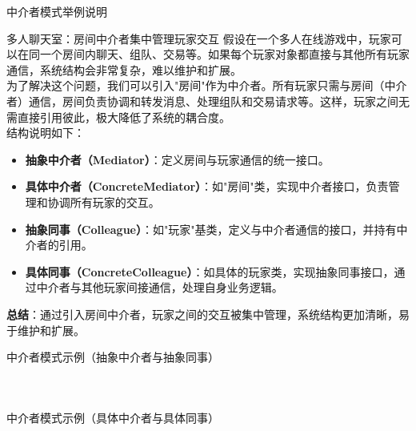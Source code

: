 \documentclass[UTF8,aspectratio=169]{beamer}
\begin{document}
\begin{frame}{中介者模式举例说明}
    \begin{exampleytublock}{多人聊天室：房间中介者集中管理玩家交互}
        假设在一个多人在线游戏中，玩家可以在同一个房间内聊天、组队、交易等。如果每个玩家对象都直接与其他所有玩家通信，系统结构会非常复杂，难以维护和扩展。\\
        为了解决这个问题，我们可以引入"房间"作为中介者。所有玩家只需与房间（中介者）通信，房间负责协调和转发消息、处理组队和交易请求等。这样，玩家之间无需直接引用彼此，极大降低了系统的耦合度。\\[0.5em]
        结构说明如下：
        \begin{itemize}
            \item \textbf{抽象中介者（Mediator）}：定义房间与玩家通信的统一接口。
            \item \textbf{具体中介者（ConcreteMediator）}：如"房间"类，实现中介者接口，负责管理和协调所有玩家的交互。
            \item \textbf{抽象同事（Colleague）}：如"玩家"基类，定义与中介者通信的接口，并持有中介者的引用。
            \item \textbf{具体同事（ConcreteColleague）}：如具体的玩家类，实现抽象同事接口，通过中介者与其他玩家间接通信，处理自身业务逻辑。
        \end{itemize}
        \textbf{总结}：通过引入房间中介者，玩家之间的交互被集中管理，系统结构更加清晰，易于维护和扩展。
    \end{exampleytublock}
\end{frame}

\begin{frame}{中介者模式示例（抽象中介者与抽象同事）}
    \begin{columns}
        \begin{column}{0.48\textwidth}
            \inputminted[firstline=1, lastline=18]{cpp}{code/mediator_pattern.cpp}
        \end{column}
        \begin{column}{0.48\textwidth}
            \inputminted[firstline=20, lastline=39]{cpp}{code/mediator_pattern.cpp}
        \end{column}
    \end{columns}
\end{frame}

\begin{frame}{中介者模式示例（具体中介者与具体同事）}
    \begin{columns}
        \begin{column}{0.48\textwidth}
            \inputminted[firstline=41, lastline=60]{cpp}{code/mediator_pattern.cpp}
        \end{column}
        \begin{column}{0.48\textwidth}
            \inputminted[firstline=62, lastline=77]{cpp}{code/mediator_pattern.cpp}
        \end{column}
    \end{columns}
\end{frame}
\end{document}
